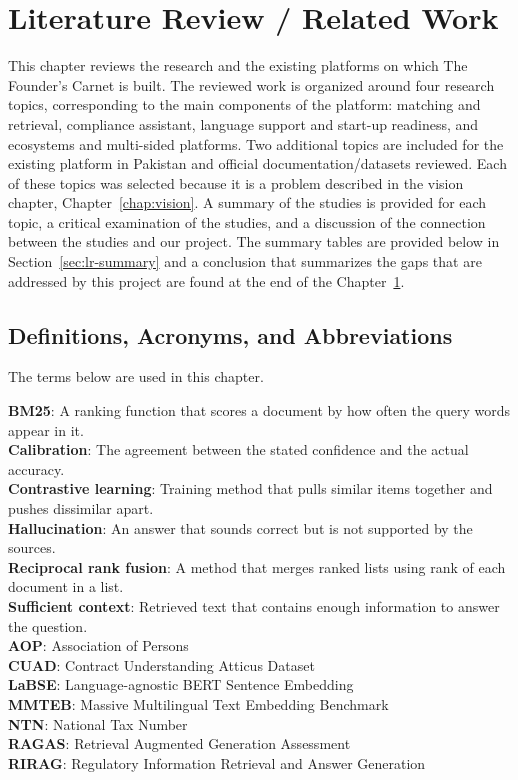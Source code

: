 \documentclass{FastFyp}
\begin{document}
\chapter{Literature Review / Related Work}\label{chap:lit-review}
This chapter reviews the research and the existing platforms on which The Founder's Carnet is built. The reviewed work is organized around four research topics, corresponding to the main components of the platform: matching and retrieval, compliance assistant, language support and start-up readiness, and ecosystems and multi-sided platforms. Two additional topics are included for the existing platform in Pakistan and official documentation/datasets reviewed. Each of these topics was selected because it is a problem described in the vision chapter, Chapter~\ref{chap:vision}. A summary of the studies is provided for each topic, a critical examination of the studies, and a discussion of the connection between the studies and our project. The summary tables are provided below in Section~\ref{sec:lr-summary} and a conclusion that summarizes the gaps that are addressed by this project are found at the end of the Chapter~\ref{chap:lit-review}.

\section{Definitions, Acronyms, and Abbreviations}
The terms below are used in this chapter.

\textbf{BM25}: A ranking function that scores a document by how often the query words appear in it.\\
\textbf{Calibration}: The agreement between the stated confidence and the actual accuracy.\\
\textbf{Contrastive learning}: Training method that pulls similar items together and pushes dissimilar apart.\\
\textbf{Hallucination}: An answer that sounds correct but is not supported by the sources.\\
\textbf{Reciprocal rank fusion}: A method that merges ranked lists using rank of each document in a list.\\
\textbf{Sufficient context}: Retrieved text that contains enough information to answer the question.\\
\textbf{AOP}: Association of Persons\\
\textbf{CUAD}: Contract Understanding Atticus Dataset\\
\textbf{LaBSE}: Language-agnostic BERT Sentence Embedding\\
\textbf{MMTEB}: Massive Multilingual Text Embedding Benchmark\\
\textbf{NTN}: National Tax Number\\
\textbf{RAGAS}: Retrieval Augmented Generation Assessment\\
\textbf{RIRAG}: Regulatory Information Retrieval and Answer Generation
\end{document}
